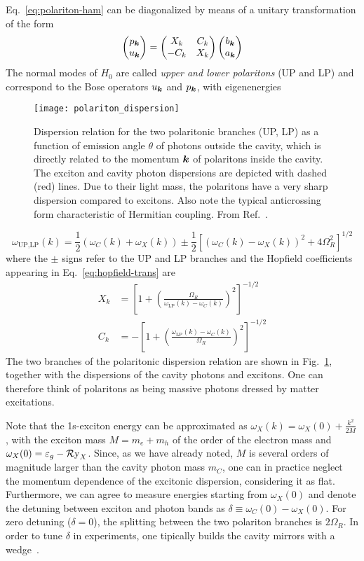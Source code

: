 Eq.~\eqref{eq:polariton-ham} can be diagonalized by means of a unitary
transformation of the form~\cite{Hopfield1958}
%
\begin{equation}\label{eq:hopfield-trans}
  \begin{pmatrix} p_{\bm{k}}\\ u_{\bm{k}} \end{pmatrix} = \begin{pmatrix} X_k & C_k\\ -C_k & X_k \end{pmatrix} \begin{pmatrix} b_{\bm{k}}\\ a_{\bm{k}} \end{pmatrix}
\end{equation}
% 
The normal modes of $H_0$ are called \textit{upper and lower
  polaritons} (UP and LP) and correspond to the Bose operators
$u_{\bm{k}}$ and $p_{\bm{k}}$, with eigenenergies
%
\begin{figure}[tb]\centering
  \texttt{[image: polariton\_dispersion]}
  \caption{
    Dispersion relation for the two polaritonic branches (UP, LP) as a function of emission angle $\theta$ of photons outside the cavity, which is directly related to the momentum $\bm{k}$ of polaritons inside the cavity. The exciton and cavity photon dispersions are depicted with dashed (red) lines. Due to their light mass, the polaritons have a very sharp dispersion  compared to excitons. Also note the typical anticrossing form characteristic of Hermitian coupling.
From Ref.~\cite{Keeling_2007}.
}\label{fig:polariton-dispersion}
\end{figure}
% 
\begin{equation}\label{eq:polariton-dispersion}
  \omega_{\text{UP,LP}}(k) = \frac{1}{2}\left(\omega_C(k) + \omega_X(k)\right) \pm \frac{1}{2}\left[\left(\omega_C(k) - \omega_X(k)\right)^2 + 4 \Omega_R^2\right]^{1/2}
\end{equation}
% 
where the $\pm$ signs refer to the UP and LP branches and the Hopfield
coefficients appearing in Eq.~\eqref{eq:hopfield-trans} are
\begin{align}
  X_k & =\left[1 + \left(\frac{\Omega_R}{\omega_{\text{LP}}(k) - \omega_C(k)}\right)^2\right]^{-1/2}\label{eq:hopfield-X}\\
  C_k & =-\left[1 + \left(\frac{\omega_{\text{LP}}(k) - \omega_C(k)}{\Omega_R}\right)^2\right]^{-1/2}
\end{align}
The two branches of the polaritonic dispersion relation are shown in
Fig.~\ref{fig:polariton-dispersion}, together with the dispersions of
the cavity photons and excitons. One can therefore think of polaritons
as being massive photons dressed by matter excitations.

Note that the 1s-exciton energy can be approximated as
$\omega_X(k) = \omega_X(0) + \frac{k^2}{2M}$, with the exciton mass
$M = m_e + m_h$ of the order of the electron mass and
$\omega_X(0) = \varepsilon_g - \operatorname{\mathcal{R}y}_X$. Since, as we have already
noted, $M$ is several orders of magnitude larger than the cavity
photon mass $m_{C}$, one can in practice neglect the momentum
dependence of the excitonic dispersion, considering it as
flat. Furthermore, we can agree to measure energies starting from
$\omega_X(0)$ and denote the detuning between exciton and photon bands
as $\delta \equiv \omega_C(0) - \omega_X(0)$. For zero detuning
($\delta = 0$), the splitting between the two polariton branches is
$2\Omega_R$. In order to tune $\delta$ in experiments, one tipically
builds the cavity mirrors with a wedge~\cite{Weisbuch1992}.



